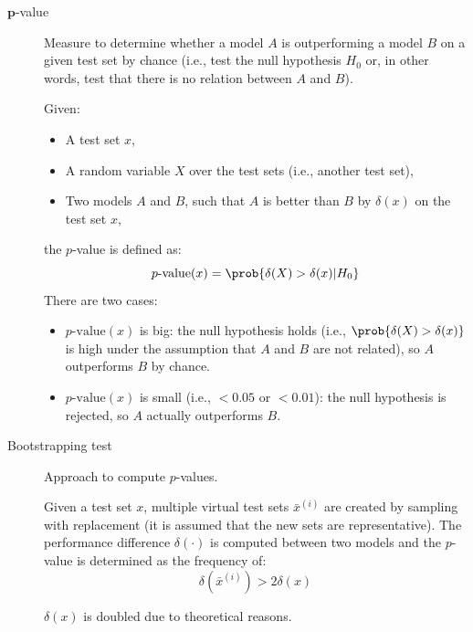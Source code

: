 \begin{description}
    \item[$\mathbf{p}$-value] 
        Measure to determine whether a model $A$ is outperforming a model $B$ on a given test set by chance (i.e., test the null hypothesis $H_0$ or, in other words, test that there is no relation between $A$ and $B$).

        Given:
        \begin{itemize}
            \item A test set $x$,
            \item A random variable $X$ over the test sets (i.e., another test set),
            \item Two models $A$ and $B$, such that $A$ is better than $B$ by $\delta(x)$ on the test set $x$,
        \end{itemize}
        the $p$-value is defined as:
        \[ p\text{-value}(x) = \prob{\delta(X) > \delta(x) | H_0} \]
        There are two cases:
        \begin{itemize}
            \item $p\text{-value}(x)$ is big: the null hypothesis holds (i.e., $\prob{\delta(X) > \delta(x)}$ is high under the assumption that $A$ and $B$ are not related), so $A$ outperforms $B$ by chance.
            \item $p\text{-value}(x)$ is small (i.e., $< 0.05$ or $< 0.01$): the null hypothesis is rejected, so $A$ actually outperforms $B$.
        \end{itemize}

    \item[Bootstrapping test] 
        Approach to compute $p$-values.

        Given a test set $x$, multiple virtual test sets $\bar{x}^{(i)}$ are created by sampling with replacement (it is assumed that the new sets are representative). The performance difference $\delta(\cdot)$ is computed between two models and the $p$-value is determined as the frequency of:
        \[ \delta(\bar{x}^{(i)}) > 2\delta(x) \]

        \begin{remark}
            $\delta(x)$ is doubled due to theoretical reasons.
        \end{remark}


\end{description}
